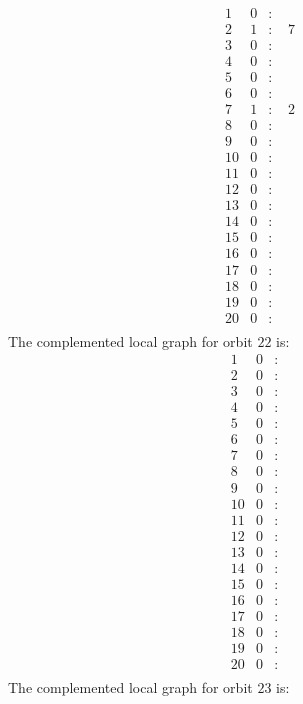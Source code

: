 \documentclass[12pt]{article}
\begin{document}
\begin{equation*}
\begin{array}{rrcl}
1&0&:&\\
2&1&:&\,\,7\\
3&0&:&\\
4&0&:&\\
5&0&:&\\
6&0&:&\\
7&1&:&\,\,2\\
8&0&:&\\
9&0&:&\\
10&0&:&\\
11&0&:&\\
12&0&:&\\
13&0&:&\\
14&0&:&\\
15&0&:&\\
16&0&:&\\
17&0&:&\\
18&0&:&\\
19&0&:&\\
20&0&:&\\
\end{array}
\end{equation*}
The complemented local graph for orbit $22$ is:
\begin{equation*}
\begin{array}{rrcl}
1&0&:&\\
2&0&:&\\
3&0&:&\\
4&0&:&\\
5&0&:&\\
6&0&:&\\
7&0&:&\\
8&0&:&\\
9&0&:&\\
10&0&:&\\
11&0&:&\\
12&0&:&\\
13&0&:&\\
14&0&:&\\
15&0&:&\\
16&0&:&\\
17&0&:&\\
18&0&:&\\
19&0&:&\\
20&0&:&\\
\end{array}
\end{equation*}
The complemented local graph for orbit $23$ is:
\end{document}
